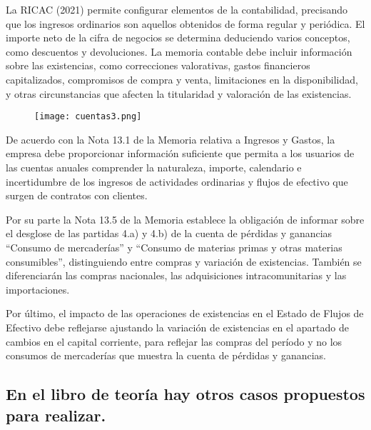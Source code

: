 \documentclass{article}
\begin{document}
La RICAC (2021) permite configurar elementos de la contabilidad, precisando que los ingresos ordinarios son aquellos obtenidos de forma regular y periódica. El importe neto de la cifra de negocios se determina deduciendo varios conceptos, como descuentos y devoluciones. La memoria contable debe incluir información sobre las existencias, como correcciones valorativas, gastos financieros capitalizados, compromisos de compra y venta, limitaciones en la disponibilidad, y otras circunstancias que afecten la titularidad y valoración de las existencias.

\begin{figure}[H]
    \centering
    \texttt{[image: cuentas3.png]}
\end{figure}


De acuerdo con la Nota 13.1 de la Memoria relativa a Ingresos y Gastos, la empresa debe proporcionar información suficiente que permita a los usuarios de las cuentas anuales comprender la naturaleza, importe, calendario e incertidumbre de los ingresos de actividades ordinarias y flujos de efectivo que surgen de contratos con clientes.

Por su parte la Nota 13.5 de la Memoria establece la obligación de informar sobre el desglose de las partidas 4.a) y 4.b) de la cuenta de pérdidas y ganancias “Consumo de mercaderías” y “Consumo de materias primas y otras materias consumibles”, distinguiendo entre compras y variación de existencias. También se diferenciarán las compras nacionales, las adquisiciones intracomunitarias y las importaciones.

Por último, el impacto de las operaciones de existencias en el Estado de Flujos de Efectivo debe reflejarse ajustando la variación de existencias en el apartado de cambios en el capital corriente, para reflejar las compras del período y no los consumos de mercaderías que muestra la cuenta de pérdidas y ganancias.


\begin{tcolorbox}[colback=green!5!white, colframe=blue!75!black, title=Plus]
\subsection*{En el libro de teoría hay otros casos propuestos para realizar.}
\end{tcolorbox}
\end{document}
